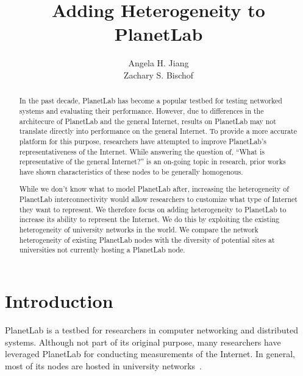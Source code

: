 \documentclass{sig-alternate-10pt}
\begin{document}
\title{Adding Heterogeneity to PlanetLab}

\author{
\alignauthor
Angela H. Jiang\\
\alignauthor
Zachary S. Bischof\\
}


\maketitle
\begin{abstract}

In the past decade, PlanetLab has become a popular testbed for testing
networked systems and evaluating their performance. However, due to differences
in the architecure of PlanetLab and the general Internet, results on PlanetLab
may not translate directly into performance on the general Internet.  To
provide a more accurate platform for this purpose, researchers have attempted
to improve PlanetLab's representativeness of the Internet. While answering the
question of, ``What is representative of the general Internet?'' is an on-going
topic in research, prior works have shown characteristics of these nodes to be
generally homogenous. 


While we don't know what to model PlanetLab after, increasing the heterogeneity
of PlanetLab interconnectivity would allow researchers to customize what type
of Internet they want to represent.  We therefore focus on adding heterogeneity
to PlanetLab to increase its ability to represent the Internet.  We do this by
exploiting the existing heterogeneity of university networks in the world. We
compare the network heterogeneity of existing PlanetLab nodes with the
diversity of potential sites at universities not currently hosting a PlanetLab
node.

\end{abstract}

\section{Introduction}

PlanetLab is a testbed for researchers in computer networking and distributed
systems. Although not part of its original purpose, many researchers have
leveraged PlanetLab for conducting measurements of the Internet.  In general,
most of its nodes are hosted in university
networks~\cite{banerjee:connectivity}.
\end{document}
